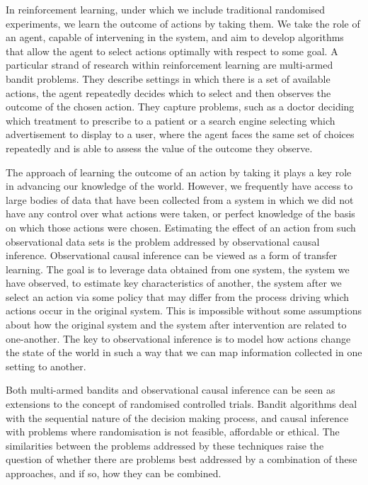 \documentclass[11pt,a4paper,twoside]{report}
\theoremstyle{plain}
\theoremstyle{definition}
\begin{document}
In reinforcement learning, under which we include traditional randomised experiments, we learn the outcome of actions by taking them. We take the role of an agent, capable of intervening in the system, and aim to develop algorithms that allow the agent to select actions optimally with respect to some goal. A particular strand of research within reinforcement learning are multi-armed bandit problems. They describe settings in which there is a set of available actions, the agent repeatedly decides which to select and then observes the outcome of the chosen action. They capture problems, such as a doctor deciding which treatment to prescribe to a patient or a search engine selecting which advertisement to display to a user, where the agent faces the same set of choices repeatedly and is able to assess the value of the outcome they observe. 

The approach of learning the outcome of an action by taking it plays a key role in advancing our knowledge of the world. However, we frequently have access to large bodies of data that have been collected from a system in which we did not have any control over what actions were taken, or perfect knowledge of the basis on which those actions were chosen. Estimating the effect of an action from such observational data sets is the problem addressed by observational causal inference. Observational causal inference can be viewed as a form of transfer learning. The goal is to leverage data obtained from one system, the system we have observed, to estimate key characteristics of another, the system after we select an action via some policy that may differ from the process driving which actions occur in the original system. This is impossible without some assumptions about how the original system and the system after intervention are related to one-another. The key to observational inference is to model how actions change the state of the world in such a way that we can map information collected in one setting to another. 

Both multi-armed bandits and observational causal inference can be seen as extensions to the concept of randomised controlled trials. Bandit algorithms deal with the sequential nature of the decision making process, and causal inference with problems where randomisation is not feasible, affordable or ethical. The similarities between the problems addressed by these techniques raise the question of whether there are problems best addressed by a combination of these approaches, and if so, how they can be combined. 
\end{document}
